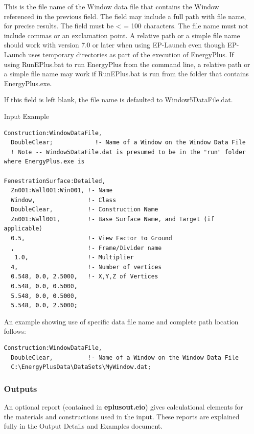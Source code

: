 This is the file name of the Window data file that contains the Window referenced in the previous field. The field may include a full path with file name, for precise results. The field must be \textless{} = 100 characters. The file name must not include commas or an exclamation point. A relative path or a simple file name should work with version 7.0 or later when using EP-Launch even though EP-Launch uses temporary directories as part of the execution of EnergyPlus. If using RunEPlus.bat to run EnergyPlus from the command line, a relative path or a simple file name may work if RunEPlus.bat is run from the folder that contains EnergyPlus.exe.

If this field is left blank, the file name is defaulted to Window5DataFile.dat.

Input Example

\begin{lstlisting}
Construction:WindowDataFile,
  DoubleClear;            !- Name of a Window on the Window Data File
  ! Note -- Window5DataFile.dat is presumed to be in the "run" folder where EnergyPlus.exe is

FenestrationSurface:Detailed,
  Zn001:Wall001:Win001, !- Name
  Window,               !- Class
  DoubleClear,          !- Construction Name
  Zn001:Wall001,        !- Base Surface Name, and Target (if applicable)
  0.5,                  !- View Factor to Ground
  ,                     !- Frame/Divider name
   1.0,                 !- Multiplier
  4,                    !- Number of vertices
  0.548, 0.0, 2.5000,   !- X,Y,Z of Vertices
  0.548, 0.0, 0.5000,
  5.548, 0.0, 0.5000,
  5.548, 0.0, 2.5000;
\end{lstlisting}

An example showing use of specific data file name and complete path location follows:

\begin{lstlisting}
Construction:WindowDataFile,
  DoubleClear,          !- Name of a Window on the Window Data File
  C:\EnergyPlusData\DataSets\MyWindow.dat;
\end{lstlisting}

\subsubsection{Outputs}\label{outputs-4-016}

An optional report (contained in \textbf{eplusout.eio}) gives calculational elements for the materials and constructions used in the input. These reports are explained fully in the Output Details and Examples document.